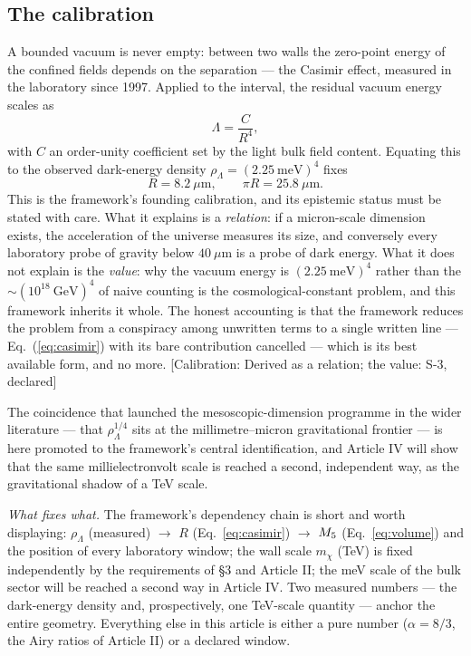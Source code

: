 \subsection{The calibration}
A bounded vacuum is never empty: between two walls the zero-point energy of the confined fields depends on the separation --- the Casimir effect, measured in the laboratory since 1997. Applied to the interval, the residual vacuum energy scales as
\begin{equation}
\Lambda=\frac{C}{R^{4}},
\label{eq:casimir}
\end{equation}
with $C$ an order-unity coefficient set by the light bulk field content. Equating this to the observed dark-energy density $\rho_{\Lambda}=(2.25~\mathrm{meV})^{4}$ fixes
\begin{equation}
R=8.2~\mu\mathrm{m},\qquad \pi R=25.8~\mu\mathrm{m}.
\end{equation}
This is the framework's founding calibration, and its epistemic status must be stated with care. What it explains is a \emph{relation}: if a micron-scale dimension exists, the acceleration of the universe measures its size, and conversely every laboratory probe of gravity below $40~\mu$m is a probe of dark energy. What it does not explain is the \emph{value}: why the vacuum energy is $(2.25~\mathrm{meV})^{4}$ rather than the $\sim(10^{18}~\mathrm{GeV})^{4}$ of naive counting is the cosmological-constant problem, and this framework inherits it whole. The honest accounting is that the framework reduces the problem from a conspiracy among unwritten terms to a single written line --- Eq.~(\ref{eq:casimir}) with its bare contribution cancelled --- which is its best available form, and no more. [Calibration: Derived as a relation; the value: S-3, declared]

The coincidence that launched the mesoscopic-dimension programme in the wider literature --- that $\rho_{\Lambda}^{1/4}$ sits at the millimetre--micron gravitational frontier --- is here promoted to the framework's central identification, and Article IV will show that the same millielectronvolt scale is reached a second, independent way, as the gravitational shadow of a TeV scale.

\emph{What fixes what.} The framework's dependency chain is short and worth displaying: $\rho_{\Lambda}$ (measured) $\to$ $R$ (Eq.~\ref{eq:casimir}) $\to$ $M_5$ (Eq.~\ref{eq:volume}) and the position of every laboratory window; the wall scale $m_\chi$ (TeV) is fixed independently by the requirements of \S3 and Article II; the meV scale of the bulk sector will be reached a second way in Article IV. Two measured numbers --- the dark-energy density and, prospectively, one TeV-scale quantity --- anchor the entire geometry. Everything else in this article is either a pure number ($\alpha=8/3$, the Airy ratios of Article II) or a declared window.

